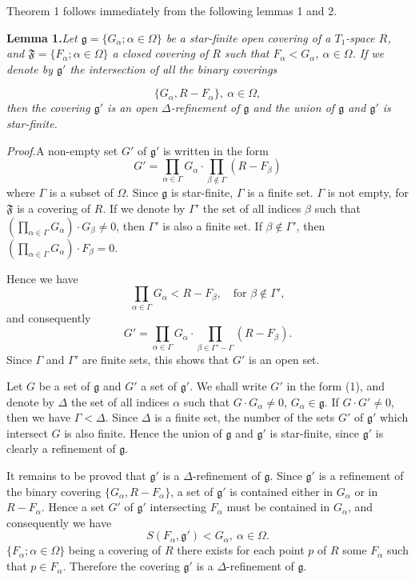 \documentclass[11pt,a4paper,leqno]{article}
\newcommand{\g}{\mathfrak g}
\newcommand{\f}{\mathfrak F}
\newcommand{\lem}[2]{\par\medskip\textbf{Lemma #1.}\quad\textit{#2}\par}
\newcommand{\proof}{\textit{Proof.}\quad}
\begin{document}
Theorem 1 follows immediately from the following lemmas 1 and 2.

\lem{1}{Let $\g=\{G_\alpha;\alpha\in\Omega\}$ be a star-finite open covering of a $T_1$-space $R$, and $\f=\{F_\alpha;\alpha\in\Omega\}$ a closed covering of $R$ such that $F_\alpha<G_\alpha$, $\alpha\in\Omega$. If we denote by $\g'$ the intersection of all the binary coverings}
\newpage
\[
\{G_\alpha,R-F_\alpha\},\ \alpha\in\Omega,
\]
\textit{then the covering $\g'$ is an open $\Delta$-refinement of $\g$ and the union of $\g$ and $\g'$ is star-finite.}

\proof A non-empty set $G'$ of $\g'$ is written in the form
\begin{equation}\tag{1}
G'=\prod_{\alpha\in\Gamma}G_\alpha\cdot\prod_{\beta\notin\Gamma}(R-F_\beta)
\end{equation}
where $\Gamma$ is a subset of $\Omega$. Since $\g$ is star-finite, $\Gamma$ is a finite set. $\Gamma$ is not empty, for $\f$ is a covering of $R$. If we denote by $\Gamma'$ the set of all indices $\beta$ such that $(\prod_{\alpha\in\Gamma}G_\alpha)\cdot G_\beta\ne0$, then $\Gamma'$ is also a finite set. If $\beta\notin\Gamma'$, then $(\prod_{\alpha\in\Gamma}G_\alpha)\cdot F_\beta=0$.

Hence we have
\[
\prod_{\alpha\in\Gamma}G_\alpha<R-F_\beta,\quad\text{for }\beta\notin\Gamma',
\]
and consequently
\[
G'=\prod_{\alpha\in\Gamma}G_\alpha\cdot\prod_{\beta\in\Gamma'-\Gamma}(R-F_\beta).
\]
Since $\Gamma$ and $\Gamma'$ are finite sets, this shows that $G'$ is an open set.

Let $G$ be a set of $\g$ and $G'$ a set of $\g'$. We shall write $G'$ in the form (1), and denote by $\Delta$ the set of all indices $\alpha$ such that $G\cdot G_\alpha\ne0$, $G_\alpha\in\g$. If $G\cdot G'\ne0$, then we have $\Gamma<\Delta$. Since $\Delta$ is a finite set, the number of the sets $G'$ of $\g'$ which intersect $G$ is also finite. Hence the union of $\g$ and $\g'$ is star-finite, since $\g'$ is clearly a refinement of $\g$.

It remains to be proved that $\g'$ is a $\Delta$-refinement of $\g$. Since $\g'$ is a refinement of the binary covering $\{G_\alpha,R-F_\alpha\}$, a set of $\g'$ is contained either in $G_\alpha$ or in $R-F_\alpha$. Hence a set $G'$ of $\g'$ intersecting $F_\alpha$ must be contained in $G_\alpha$, and consequently we have
\[
S(F_\alpha,\g')<G_\alpha,\ \alpha\in\Omega.
\]
$\{F_\alpha;\alpha\in\Omega\}$ being a covering of $R$ there exists for each point $p$ of $R$ some $F_\alpha$ such that $p\in F_\alpha$. Therefore the covering $\g'$ is a $\Delta$-refinement of $\g$.
\end{document}
